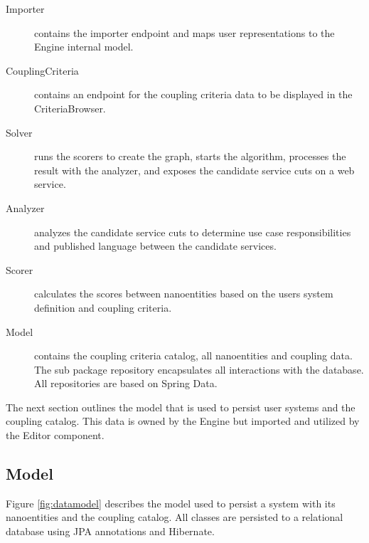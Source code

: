 \begin{description}
	\item[Importer] contains the importer endpoint and maps user representations to the Engine internal model. 
	\item[CouplingCriteria] contains an endpoint for the coupling criteria data to be displayed in the CriteriaBrowser.
	\item[Solver] runs the scorers to create the graph, starts the algorithm, processes the result with the analyzer, and exposes the candidate service cuts on a web service.
	\item[Analyzer] analyzes the candidate service cuts to determine use case responsibilities and published language between the candidate services.
	\item[Scorer] calculates the scores between nanoentities based on the users system definition and coupling criteria.
	\item[Model] contains the coupling criteria catalog, all nanoentities and coupling data. The sub package repository encapsulates all interactions with the database. All repositories are based on Spring Data\cite{springdata}.
\end{description}

The next section outlines the model that is used to persist user systems and the coupling catalog. This data is owned by the Engine but imported and utilized by the Editor component.

\subsection{Model}

Figure \ref{fig:datamodel} describes the model used to persist a system with its nanoentities and the coupling catalog. All classes are persisted to a relational database using \gls{JPA} annotations and Hibernate\cite{hibernate}.

